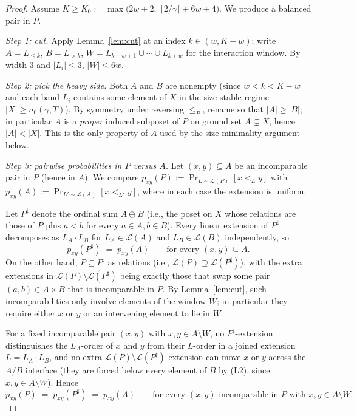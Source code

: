 \begin{proof}
Assume $K \ge K_0 := \max\bigl(2w+2,\; \lceil 2/\gamma \rceil + 6w +
4\bigr)$. We produce a balanced pair in $P$.

\smallskip\noindent\emph{Step 1: cut.} Apply Lemma~\ref{lem:cut} at an
index $k \in (w, K-w)$; write $A = L_{\le k}$, $B = L_{>k}$,
$W = L_{k-w+1} \cup \cdots \cup L_{k+w}$ for the interaction window.
By width-$3$ and $|L_i| \le 3$, $|W| \le 6w$.

\smallskip\noindent\emph{Step 2: pick the heavy side.} Both $A$ and
$B$ are nonempty (since $w < k < K - w$ and each band $L_i$ contains
some element of $X$ in the size-stable regime $|X| \ge n_0(\gamma,
T)$). By symmetry under reversing $\le_P$, rename so that $|A| \ge
|B|$; in particular $A$ is a \emph{proper} induced subposet of $P$ on
ground set $A \subsetneq X$, hence $|A| < |X|$. This is the only
property of $A$ used by the size-minimality argument below.

\smallskip\noindent\emph{Step 3: pairwise probabilities in $P$ versus
$A$.} Let $(x,y) \subseteq A$ be an incomparable pair in $P$ (hence in
$A$). We compare $p_{xy}(P) := \Pr_{L \sim \mathcal{L}(P)}[x <_L y]$
with $p_{xy}(A) := \Pr_{L' \sim \mathcal{L}(A)}[x <_{L'} y]$, where in
each case the extension is uniform.

Let $P^\sharp$ denote the ordinal sum $A \oplus B$ (i.e., the poset on
$X$ whose relations are those of $P$ plus $a < b$ for every
$a \in A, b \in B$). Every linear extension of $P^\sharp$ decomposes as
$L_A \cdot L_B$ for $L_A \in \mathcal{L}(A)$ and $L_B \in
\mathcal{L}(B)$ independently, so
\[
  p_{xy}(P^\sharp) \;=\; p_{xy}(A)
  \qquad
  \text{for every $(x,y) \subseteq A$.}
\]
On the other hand, $P \subseteq P^\sharp$ as relations (i.e.,
$\mathcal{L}(P) \supseteq \mathcal{L}(P^\sharp)$), with the extra
extensions in $\mathcal{L}(P) \setminus \mathcal{L}(P^\sharp)$ being
exactly those that swap some pair $(a,b) \in A \times B$ that is
incomparable in $P$. By Lemma~\ref{lem:cut}, such incomparabilities
only involve elements of the window $W$; in particular they require
either $x$ or $y$ or an intervening element to lie in $W$.

For a fixed incomparable pair $(x,y)$ with $x,y \in A \setminus W$, no
$P^\sharp$-extension distinguishes the $L_A$-order of $x$ and $y$ from
their $L$-order in a joined extension $L = L_A \cdot L_B$, and no
extra $\mathcal{L}(P) \setminus \mathcal{L}(P^\sharp)$ extension can
move $x$ or $y$ across the $A/B$ interface (they are forced below
every element of $B$ by (L2), since $x,y \in A \setminus W$). Hence
\begin{equation}\label{eq:bulk-pxy}
  p_{xy}(P) \;=\; p_{xy}(P^\sharp) \;=\; p_{xy}(A)
  \qquad
  \text{for every $(x,y)$ incomparable in $P$ with $x,y \in A \setminus W$.}
\end{equation}


\end{proof}
